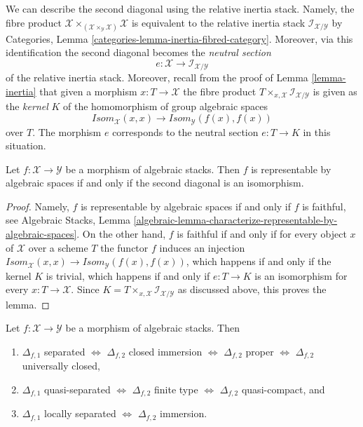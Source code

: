 \medskip\noindent
We can describe the second diagonal using the relative inertia stack.
Namely, the fibre product
$\mathcal{X}
\times_{(\mathcal{X} \times_\mathcal{Y} \mathcal{X})} \mathcal{X}$
is equivalent to the relative inertia stack
$\mathcal{I}_{\mathcal{X}/\mathcal{Y}}$ by
Categories, Lemma \ref{categories-lemma-inertia-fibred-category}.
Moreover, via this identification the second diagonal becomes the
{\it neutral section}
$$
e : \mathcal{X} \to \mathcal{I}_{\mathcal{X}/\mathcal{Y}}
$$
of the relative inertia stack. Moreover, recall from the proof of
Lemma \ref{lemma-inertia}
that given a morphism $x : T \to \mathcal{X}$ the fibre product
$T \times_{x, \mathcal{X}} \mathcal{I}_{\mathcal{X}/\mathcal{Y}}$
is given as the {\it kernel} $K$ of the homomorphism of group algebraic spaces
$$
\mathit{Isom}_\mathcal{X}(x, x)
\longrightarrow
\mathit{Isom}_\mathcal{Y}(f(x), f(x))
$$
over $T$. The morphism $e$ corresponds to the neutral section
$e : T \to K$ in this situation.

\begin{lemma}
\label{lemma-second-diagonal}
Let $f : \mathcal{X} \to \mathcal{Y}$ be a morphism of algebraic stacks.
Then $f$ is representable by algebraic spaces if and only if
the second diagonal is an isomorphism.
\end{lemma}

\begin{proof}
Namely, $f$ is representable by algebraic spaces if and only if $f$ is
faithful, see
Algebraic Stacks,
Lemma \ref{algebraic-lemma-characterize-representable-by-algebraic-spaces}.
On the other hand, $f$ is faithful if and only if for every object $x$
of $\mathcal{X}$ over a scheme $T$ the functor $f$ induces an injection
$\mathit{Isom}_\mathcal{X}(x, x) \to
\mathit{Isom}_\mathcal{Y}(f(x), f(x))$,
which happens if and only if the kernel $K$ is trivial, which happens if and
only if $e : T \to K$ is an isomorphism for every $x : T \to \mathcal{X}$.
Since $K = T \times_{x, \mathcal{X}} \mathcal{I}_{\mathcal{X}/\mathcal{Y}}$
as discussed above, this proves the lemma.
\end{proof}

\begin{lemma}
\label{lemma-first-diagonal-separated-second-diagonal-closed}
Let $f : \mathcal{X} \to \mathcal{Y}$ be a morphism of algebraic stacks.
Then
\begin{enumerate}
\item $\Delta_{f, 1}$ separated $\Leftrightarrow$
$\Delta_{f, 2}$ closed immersion $\Leftrightarrow$
$\Delta_{f, 2}$ proper $\Leftrightarrow$
$\Delta_{f, 2}$ universally closed,
\item $\Delta_{f, 1}$ quasi-separated $\Leftrightarrow$
$\Delta_{f, 2}$ finite type $\Leftrightarrow$ $\Delta_{f, 2}$ quasi-compact,
and
\item $\Delta_{f, 1}$ locally separated $\Leftrightarrow$
$\Delta_{f, 2}$ immersion.
\end{enumerate}
\end{lemma}

